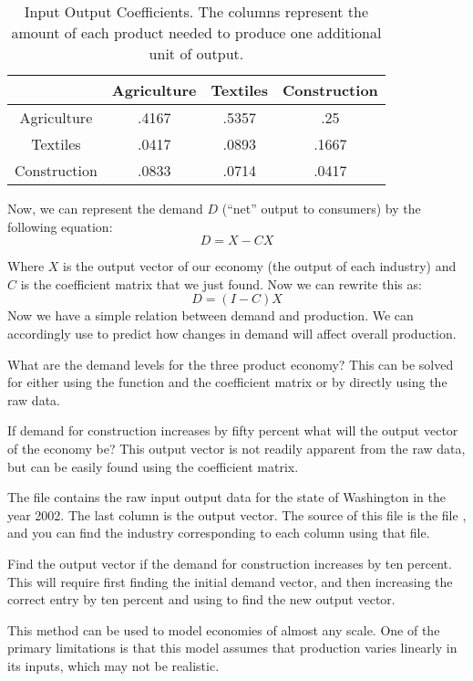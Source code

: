 \begin{table}

\begin{center}
\begin{tabular}{|c|c|c|c|} 
\hline
& Agriculture & Textiles & Construction \\ \hline
Agriculture & .4167 & .5357 & .25 \\ \hline
Textiles & .0417 & .0893 & .1667 \\ \hline
Construction & .0833 & .0714 & .0417 \\ \hline
\end{tabular}
\caption{Input Output Coefficients.
The columns represent the amount of each product needed to produce one additional unit of output.}
\label{IOCoefTable}
\end{center}
\end{table}

Now, we can represent the demand $D$ (``net'' output to consumers) by the following equation:
\[
D = X-CX
\]

Where $X$ is the output vector of our economy (the output of each industry) and $C$ is the coefficient matrix that we just found.
Now we can rewrite this as:
\[
D = (I-C)X
\]
Now we have a simple relation between demand and production.
We can accordingly use  to predict how changes in demand will affect overall production.

\begin{problem}
What are the demand levels for the three product economy?
This can be solved for either using the  function and the coefficient matrix or by directly using the raw data.
\end{problem}

\begin{problem}
If demand for construction increases by fifty percent what will the output vector of the economy be?
This output vector is not readily apparent from the raw data, but can be easily found using the coefficient matrix.
\end{problem}

\begin{problem}
The file  contains the raw input output data for the state of Washington in the year 2002.
The last column is the output vector.
The source of this file is the file , and you can find the industry corresponding to each column using that file.

Find the output vector if the demand for construction increases by ten percent.
This will require first finding the initial demand vector, and then increasing the correct entry by ten percent and using  to find the new output vector.
\end{problem}

This method can be used to model economies of almost any scale.
One of the primary limitations is that this model assumes that production varies linearly in its inputs, which may not be realistic.


